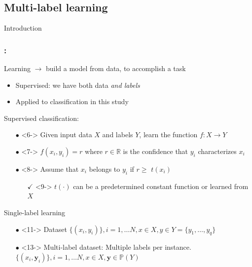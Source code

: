 \documentclass{beamer}
\begin{document}
\subsection{Multi-label learning}
\begin{frame}
\Huge{\centerline{Introduction}}
\end{frame}
\begin{frame}
\frametitle{\insertsection : \insertsubsection}
 {Learning $\rightarrow$ build a model from data, to accomplish a task}
\begin{itemize}
  	\item <3-> Supervised: we have both data \emph{and labels}
	\item <4-> Applied to classification in this study
\end{itemize}
 {Supervised classification:}
\begin{itemize}
\item[$\bullet$] <6-> Given input data $X$ and labels  $Y$,
  learn the function $f: X \rightarrow Y$ 
\item[$\bullet$] <7-> $f(x_i, y_i) = r$ where $r\in \mathbb{R}$ is the confidence that $y_i$ characterizes $x_i$
\item[$\bullet$] <8-> Assume that $x_i$ belongs to $y_i$ if $r \ge $ $t(x_i)$
\begin{itemize}%
\item[$\checkmark$] <9-> $t(\cdot)$ can be a predetermined constant function or learned from $X$
\end{itemize}
\end{itemize}

 {Single-label learning}
\begin{itemize}
\item[$\bullet$] <11-> Dataset $\{ (x_i, y_i)\}, i = 1, \dots N, x \in X, y \in Y=\{y_1,\dots,y_q\}$
\end{itemize}

\begin{itemize}
\item[$\bullet$] <13-> Multi-label dataset: Multiple labels per instance. $\{ (x_i, \bm{y}_i)\}, i = 1, \dots N, x \in X, \bm{y} \in \mathbb{P}(Y)$

\end{itemize}
\end{frame}
\end{document}
